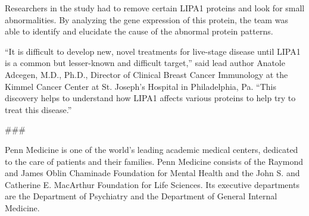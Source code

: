 \documentclass{article}
\begin{document}
Researchers in the study had to remove certain LIPA1 proteins and look for small abnormalities. By analyzing the gene expression of this protein, the team was able to identify and elucidate the cause of the abnormal protein patterns.

“It is difficult to develop new, novel treatments for live-stage disease until LIPA1 is a common but lesser-known and difficult target,” said lead author Anatole Adcegen, M.D., Ph.D., Director of Clinical Breast Cancer Immunology at the Kimmel Cancer Center at St. Joseph’s Hospital in Philadelphia, Pa. “This discovery helps to understand how LIPA1 affects various proteins to help try to treat this disease.”

\#\#\#

Penn Medicine is one of the world’s leading academic medical centers, dedicated to the care of patients and their families. Penn Medicine consists of the Raymond and James Oblin Chaminade Foundation for Mental Health and the John S. and Catherine E. MacArthur Foundation for Life Sciences. Its executive departments are the Department of Psychiatry and the Department of General Internal Medicine.
\end{document}
